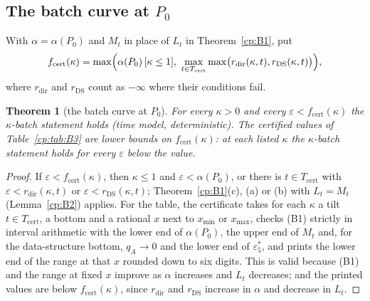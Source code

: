 \documentclass[11pt]{article}
\newtheorem{theorem}{Theorem}[section]
\theoremstyle{definition}
\theoremstyle{remark}
\providecommand{\eps}{\varepsilon}
\newcommand{\es}{\varepsilon^*_5}             %
\newcommand{\fbat}{f}                         %
\newcommand{\Pzero}{P_0}                      %
\newcommand{\Tcert}{T_{\mathrm{cert}}}               %
\newcommand{\rdir}{r_{\mathrm{dir}}}                 %
\newcommand{\rDS}{r_{\mathrm{DS}}}                   %
\newcommand{\fcert}{\fbat_{\mathrm{cert}}}           %
\begin{document}
\subsection{The batch curve at \texorpdfstring{$\Pzero$}{P0}}\label{cp:sec:batchcurve}

With $\alpha=\alpha(\Pzero)$ and $M_t$ in place of $L_t$ in Theorem~\ref{cp:B1}, put
\[
\fcert(\kappa)=\max\Bigl(\alpha(\Pzero)\,[\kappa\le1],\ \max_{t\in\Tcert}\max\bigl(\rdir(\kappa,t),\rDS(\kappa,t)\bigr)\Bigr),
\]
where $\rdir$ and $\rDS$ count as $-\infty$ where their conditions fail.

\begin{theorem}[the batch curve at $\Pzero$]\label{cp:B3}
For every $\kappa>0$ and every $\eps<\fcert(\kappa)$ the $\kappa$-batch statement holds (time model, deterministic). The certified values of Table~\ref{cp:tab:B3} are lower bounds on $\fcert(\kappa)$: at each listed $\kappa$ the $\kappa$-batch statement holds for every $\eps$ below the value.
\end{theorem}

\begin{proof}
If $\eps<\fcert(\kappa)$, then $\kappa\le1$ and $\eps<\alpha(\Pzero)$, or there is $t\in\Tcert$ with $\eps<\rdir(\kappa,t)$ or $\eps<\rDS(\kappa,t)$; Theorem~\ref{cp:B1}(c), (a) or (b) with $L_t=M_t$ (Lemma~\ref{cp:B2}) applies. For the table, the certificate takes for each $\kappa$ a tilt $t\in\Tcert$, a bottom and a rational $x$ next to $x_{\min}$ or $x_{\max}$, checks (B1) strictly in interval arithmetic with the lower end of $\alpha(\Pzero)$, the upper end of $M_t$ and, for the data-structure bottom, $q_A\to0$ and the lower end of $\es$, and prints the lower end of the range at that $x$ rounded down to six digits. This is valid because (B1) and the range at fixed $x$ improve as $\alpha$ increases and $L_t$ decreases; and the printed values are below $\fcert(\kappa)$, since $\rdir$ and $\rDS$ increase in $\alpha$ and decrease in $L_t$.
\end{proof}
\end{document}
